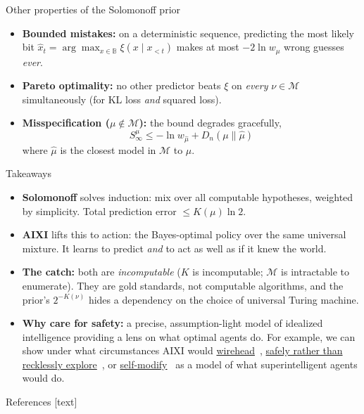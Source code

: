 \documentclass[10pt,aspectratio=169]{beamer}
\newcommand{\citev}[1]{\begingroup\hypersetup{linkcolor=cyan}\cite{#1}\endgroup}
\newcommand{\cM}{\mathcal{M}}
\newcommand{\B}{\mathbb{B}}
\begin{document}
\begin{frame}{Other properties of the Solomonoff prior}
\begin{itemize}
    \item \textbf{Bounded mistakes:} on a deterministic sequence, predicting the
    most likely bit $\hat{x}_t = \arg\max_{x \in \B} \xi(x \mid x_{<t})$ makes at most $-2\ln w_\mu$ wrong guesses \emph{ever}.
    \pause
    \item \textbf{Pareto optimality:} no other predictor beats $\xi$ on \emph{every} $\nu\in\cM$
    simultaneously (for KL loss \emph{and} squared loss).
    \pause
    \item \textbf{Misspecification ($\mu \notin \cM$):} the bound degrades gracefully,
    \[
    S^\mu_\infty \leq -\ln w_{\hat\mu} +  D_n(\mu \parallel \hat\mu)  
    \]
    where $\hat\mu$ is the closest model in $\cM$ to $\mu$.
\end{itemize}
\end{frame}


\begin{frame}{Takeaways}
\begin{itemize}
    \item \textbf{Solomonoff} solves induction: mix over all computable hypotheses, weighted by simplicity.
    Total prediction error $\leq K(\mu)\ln 2$.
    \pause
    \item \textbf{AIXI} lifts this to action: the Bayes-optimal policy over the same universal mixture.
    It learns to predict \emph{and} to act as well as if it knew the world.
    \pause
    \item \textbf{The catch:} both are \emph{incomputable} ($K$ is incomputable; $\cM$ is intractable to enumerate).
    They are gold standards, not computable algorithms, and the prior's $2^{-K(\nu)}$ hides a dependency
    on the choice of universal Turing machine.
    \pause
    \item \textbf{Why care for safety:} a precise, assumption-light model of idealized 
    intelligence providing a lens on what optimal agents do. For example, we
    can show under what circumstances AIXI would \href{https://people.idsia.ch/~ring/AGI-2011/Paper-B.pdf}{wirehead}~\citev{Ring:11delusion},
    \href{https://arxiv.org/pdf/2006.03357}{safely rather than recklessly explore}~\citev{Cohen:20curiosity}, or
    \href{https://link.springer.com/chapter/10.1007/978-3-642-22887-2_1}{self-modify}~\citev{Orseau:11selfmod}
    as a model of what superintelligent agents would do.
\end{itemize}
\end{frame}

\begin{frame}[allowframebreaks]{References}
\footnotesize
{}[text]


\end{frame}
\end{document}
